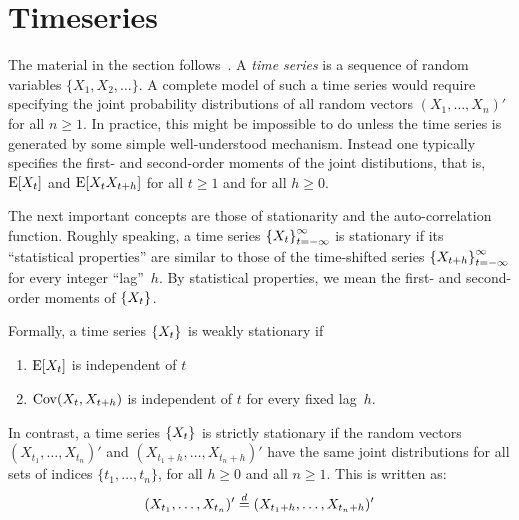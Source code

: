 \chapter{Timeseries}

The material in the section follows~\cite{BroDav}. A \emph{time series} is a
sequence of random variables $\{X_1, X_2, \ldots \}$. A complete model of such
a time series would require specifying the joint probability distributions of
all random vectors $(X_1, \ldots, X_n)'$ for all $n \geq 1$. In practice, this
might be impossible to do unless the time series is generated by some simple
well-understood mechanism. Instead one typically specifies the first- and
second-order moments of the joint distibutions, that is, $\operatorname{E}[X_t]$ and $\operatorname{E}[X_t
X_{t + h}]$ for all $t \geq 1$ and for all $h \geq 0$. 

The next important concepts are those of stationarity and the auto-correlation
function. Roughly speaking, a time series $\left \{ X_t \right \}_{t = -\infty}^{\infty}$ is
stationary if its ``statistical properties'' are similar to those of the
time-shifted series $\left \{ X_{t + h} \right \}_{t = -\infty}^{\infty}$ for every integer
``lag''~$h$. By statistical properties, we mean the first- and second-order
moments of $\left \{ X_t \right \}_{}^{}$. 

Formally, a time series $\left \{ X_t \right \}_{}^{}$ is weakly stationary if 
\begin{enumerate}
	\item $\operatorname{E}[X_t]$ is independent of $t$
	\item $\operatorname{Cov}(X_t, X_{t + h})$ is independent of $t$ for every fixed lag~$h$.
\end{enumerate} 
In contrast, a time series $\left \{ X_t \right \}_{}^{}$ is strictly stationary if the random
vectors $(X_{t_1}, \ldots, X_{t_n})'$ and $(X_{t_1 + h}, \ldots, X_{t_n + h})'$
have the same joint distributions for all sets of indices $\{t_1, \ldots,
t_n\}$, for all $h \geq 0$ and all $n \geq 1$. This is written as:
\[
(X_{t_1}, \ldots, X_{t_n})' \stackrel{d}{=} (X_{t_1 + h}, \ldots, X_{t_n + h})'
\] 

